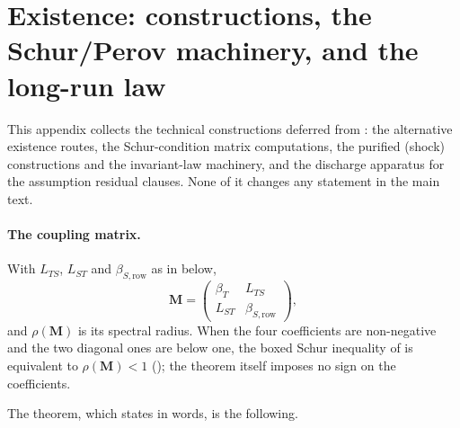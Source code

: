 \section{Existence: constructions, the Schur/Perov machinery, and the long-run law}
\label{app:existencemachinery}

This appendix collects the technical constructions deferred from
: the alternative existence
routes, the Schur-condition matrix computations, the purified
(shock) constructions and the invariant-law machinery,
and the discharge apparatus for the assumption residual clauses.
None of it changes any statement in the main text.

\paragraph{The coupling matrix.} With $L_{TS}$, $L_{ST}$ and
$\beta_{S,\mathrm{row}}$ as in  below,
\[
\mathbf M=
\begin{pmatrix}
\beta_T & L_{TS}\\
L_{ST} & \beta_{S,\mathrm{row}}
\end{pmatrix},
\]
and $\rho(\mathbf M)$ is its spectral radius. When the four coefficients are
non-negative and the two diagonal ones are below one, the boxed Schur
inequality of  is equivalent to $\rho(\mathbf M)<1$
(); the theorem itself imposes no sign on
the coefficients.

The theorem, which  states in words, is the
following.

